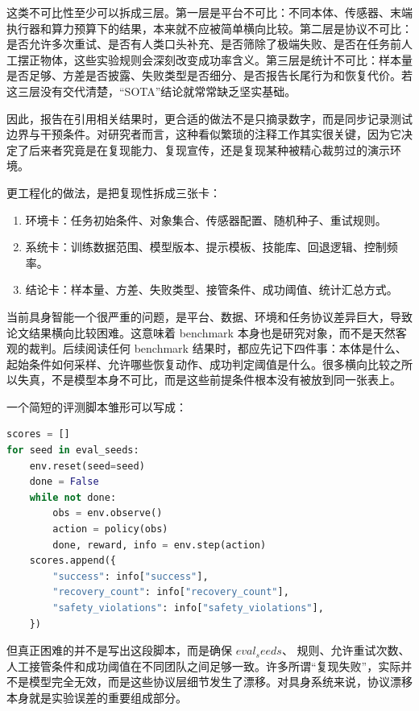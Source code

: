 这类不可比性至少可以拆成三层。第一层是平台不可比：不同本体、传感器、末端执行器和算力预算下的结果，本来就不应被简单横向比较。第二层是协议不可比：是否允许多次重试、是否有人类口头补充、是否筛除了极端失败、是否在任务前人工摆正物体，这些实验规则会深刻改变成功率含义。第三层是统计不可比：样本量是否足够、方差是否披露、失败类型是否细分、是否报告长尾行为和恢复代价。若这三层没有交代清楚，“SOTA”结论就常常缺乏坚实基础。

因此，报告在引用相关结果时，更合适的做法不是只摘录数字，而是同步记录测试边界与干预条件。对研究者而言，这种看似繁琐的注释工作其实很关键，因为它决定了后来者究竟是在复现能力、复现宣传，还是复现某种被精心裁剪过的演示环境。

更工程化的做法，是把复现性拆成三张卡：

\begin{enumerate}
\item 环境卡：任务初始条件、对象集合、传感器配置、随机种子、重试规则。
\item 系统卡：训练数据范围、模型版本、提示模板、技能库、回退逻辑、控制频率。
\item 结论卡：样本量、方差、失败类型、接管条件、成功阈值、统计汇总方式。
\end{enumerate}

当前具身智能一个很严重的问题，是平台、数据、环境和任务协议差异巨大，导致论文结果横向比较困难。这意味着 benchmark 本身也是研究对象，而不是天然客观的裁判。后续阅读任何 benchmark 结果时，都应先记下四件事：本体是什么、起始条件如何采样、允许哪些恢复动作、成功判定阈值是什么。很多横向比较之所以失真，不是模型本身不可比，而是这些前提条件根本没有被放到同一张表上。

一个简短的评测脚本雏形可以写成：

\begin{lstlisting}[language=python]
scores = []
for seed in eval_seeds:
    env.reset(seed=seed)
    done = False
    while not done:
        obs = env.observe()
        action = policy(obs)
        done, reward, info = env.step(action)
    scores.append({
        "success": info["success"],
        "recovery_count": info["recovery_count"],
        "safety_violations": info["safety_violations"],
    })
\end{lstlisting}

但真正困难的并不是写出这段脚本，而是确保 \(eval_seeds\)、\texttt{} 规则、允许重试次数、人工接管条件和成功阈值在不同团队之间足够一致。许多所谓“复现失败”，实际并不是模型完全无效，而是这些协议层细节发生了漂移。对具身系统来说，协议漂移本身就是实验误差的重要组成部分。

